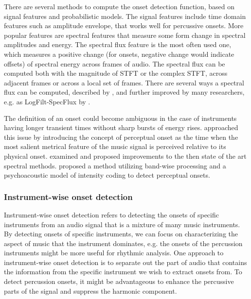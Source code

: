 There are several methods to compute the onset detection function, based on signal features and probabilistic models. The signal features include time domain features such as amplitude envelope, that works well for percussive onsets. More popular features are spectral features that measure some form change in spectral amplitudes and energy. The spectral flux feature is the most often used one, which measures a positive change (for onsets, negative change would indicate offsets) of spectral energy across frames of audio. The spectral flux can be computed both with the magnitude of \gls{STFT} or the complex \gls{STFT}, across adjacent frames or across a local set of frames. There are several ways a spectral flux can be computed, described by , and further improved by many researchers, e.g. as LogFilt-SpecFlux by . 

The definition of an onset could become ambiguous in the case of instruments having longer transient times without sharp bursts of energy rises.  approached this issue by introducing the concept of perceptual onset as the time when the most salient metrical feature of the music signal is perceived relative to its physical onset.  examined and proposed improvements to the then state of the art spectral methods.  proposed a method utilizing band-wise processing and a psychoacoustic model of intensity coding to detect perceptual onsets.
\subsubsection{Instrument-wise onset detection}
Instrument-wise onset detection refers to detecting the onsets of specific instruments from an audio signal that is a mixture of many music instruments. By detecting onsets of specific instruments, we can focus on characterizing the aspect of music that the instrument dominates, e.g. the onsets of the percussion instruments might be more useful for rhythmic analysis. One approach to instrument-wise onset detection is to separate out the part of audio that contains the information from the specific instrument we wish to extract onsets from. To detect percussion onsets, it might be advantageous to enhance the percussive parts of the signal and suppress the harmonic component. 

